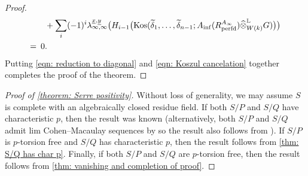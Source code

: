 \documentclass[12pt]{amsart}
\numberwithin{equation}{theorem}
\numberwithin{equation}{theorem}
\newcommand{\perfd}{\textnormal{perfd}}
\newcommand{\Kos}{\textnormal{Kos}}
\begin{document}
\begin{proof}
\begin{align}
&  \,\ \,\ + \sum_i(-1)^i\lambda_{\infty, \infty}^{\underline{x}, \underline{y}}\big(H_{i-1}\big(\Kos(\widetilde{\delta}_1,\dots,\widetilde{\delta}_{n-1}; A_{\inf}(R^{A_\infty}_\perfd) \widehat{\otimes}^\myL_{W(k)}G)\big)\big)  \notag\\
= & \,\ 0. \notag
\end{align}
Putting \autoref{eqn: reduction to diagonal} and \autoref{eqn: Koszul cancelation} together completes the proof of the theorem.
\end{proof}

\begin{proof}[Proof of \autoref{theorem: Serre positivity}]
Without loss of generality, we may assume $S$ is complete with an algebraically closed residue field. If both $S/P$ and $S/Q$ have characteristic $p$, then the result was known \cite{MalliavinPositivity1972} (alternatively, both $S/P$ and $S/Q$ admit lim Cohen--Macaulay sequences by \cite[Theorem 5.4]{BhattHochsterMaLimCM2026} so the result also follows from \cite[Theorem 6.1]{BhattHochsterMaLimCM2026}). If $S/P$ is $p$-torsion free and $S/Q$ has characteristic $p$, then the result follows from \autoref{thm: S/Q has char p}. Finally, if both $S/P$ and $S/Q$ are $p$-torsion free, then the result follows from \autoref{thm: vanishing and completion of proof}.
\end{proof}



\end{document}
